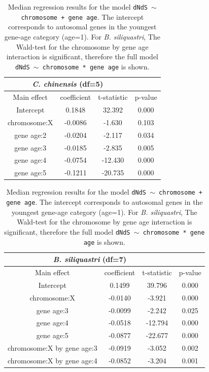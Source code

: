 \documentclass{article}
\begin{document}
\begin{table}[H]
    \centering
    \caption{Median regression results for the model \texttt{dNdS $\sim$ chromosome + gene age}. 
    The intercept corresponds to autosomal genes in the youngest gene-age category (age=1). For \textit{B. siliquastri}, 
    The Wald-test for the chromosome by gene age interaction is significant, therefore the full model 
    \texttt{dNdS $\sim$ chromosome * gene age} is shown.}
    \label{SItab:conservation}
    \begin{tabular}{c |c | c|c}
        \multicolumn{3}{c}{\textit{C. chinensis} (df=5)}\\
        \hline
        Main effect & coefficient & t-statistic & p-value \\
        \hline
        \hline
        Intercept & 0.1848 & 32.392 & 0.000\\
        \hline
        chromosome:X & -0.0086 & -1.630 & 0.103\\
        \hline
        gene age:2 & -0.0204 & -2.117 & 0.034\\
        \hline
        gene age:3 & -0.0185 & -2.835 & 0.005\\
        \hline
        gene age:4 & -0.0754 & -12.430 & 0.000\\
        \hline
        gene age:5 & -0.1211 & -20.735 & 0.000\\
        \hline
    \end{tabular}
    \hspace{0.5cm}
    \begin{tabular}{c |c | c|c}
        \multicolumn{3}{c}{\textit{B. siliquastri} (df=7)}\\
        \hline
        Main effect & coefficient & t-statistic & p-value \\
        \hline
        \hline
        Intercept & 0.1499 &  39.796 & 0.000 \\
        \hline
        chromosome:X & -0.0140 & -3.921 & 0.000 \\
        \hline
        gene age:3 & -0.0099 & -2.242 & 0.025 \\
        \hline
        gene age:4 & -0.0518 & -12.794 & 0.000 \\
        \hline
        gene age:5 & -0.0877 & -22.677 & 0.000 \\
        \hline
        chromosome:X by gene age:3 & -0.0919 & -3.052 & 0.002 \\
        \hline
        chromosome:X by gene age:4 & -0.0852 & -3.204 & 0.001 \\

\end{tabular}
\end{table}
\end{document}
